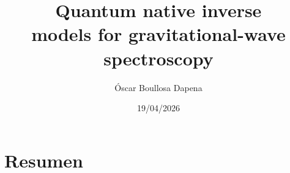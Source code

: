 \documentclass[11pt,a4paper, english]{book}
\title{Quantum native inverse \\
models for gravitational-wave\\
\hspace{0.5em}spectroscopy}
\author{\'{O}scar Boullosa Dapena}
\date{19/04/2026}
\theoremstyle{plain}
\theoremstyle{definition}
\numberwithin{equation}{chapter}
\numberwithin{figure}{chapter}
\numberwithin{table}{chapter}
\begin{document}

\renewcommand{\listfigurename}{List of Figures}
\renewcommand{\listtablename}{List of Tables}
\renewcommand{\contentsname}{Table of Contents}
\renewcommand{\figurename}{Figure}
\renewcommand{\tablename}{Table}

\frontmatter
\pagestyle{empty}
\maketitle
\newpage
\pagestyle{fancy}
\setcounter{page}{1}
\tableofcontents
\listoffigures
\listoftables

\chapter*{Resumen}
\end{document}

